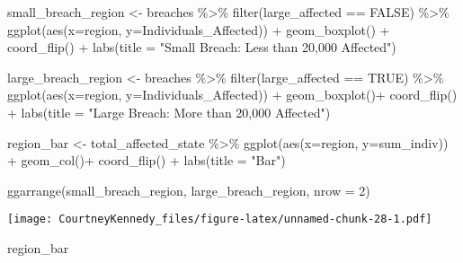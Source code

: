 \documentclass[
]{article}
\newenvironment{Shaded}{\begin{snugshade}}{\end{snugshade}}
\newcommand{\AttributeTok}[1]{\textcolor[rgb]{0.77,0.63,0.00}{#1}}
\newcommand{\ConstantTok}[1]{\textcolor[rgb]{0.00,0.00,0.00}{#1}}
\newcommand{\DecValTok}[1]{\textcolor[rgb]{0.00,0.00,0.81}{#1}}
\newcommand{\FunctionTok}[1]{\textcolor[rgb]{0.00,0.00,0.00}{#1}}
\newcommand{\NormalTok}[1]{#1}
\newcommand{\OtherTok}[1]{\textcolor[rgb]{0.56,0.35,0.01}{#1}}
\newcommand{\SpecialCharTok}[1]{\textcolor[rgb]{0.00,0.00,0.00}{#1}}
\newcommand{\StringTok}[1]{\textcolor[rgb]{0.31,0.60,0.02}{#1}}
\begin{document}
\begin{Shaded}
\begin{Highlighting}[]
\NormalTok{small\_breach\_region }\OtherTok{\textless{}{-}}\NormalTok{ breaches }\SpecialCharTok{\%\textgreater{}\%}
  \FunctionTok{filter}\NormalTok{(large\_affected }\SpecialCharTok{==} \ConstantTok{FALSE}\NormalTok{) }\SpecialCharTok{\%\textgreater{}\%}
  \FunctionTok{ggplot}\NormalTok{(}\FunctionTok{aes}\NormalTok{(}\AttributeTok{x=}\NormalTok{region, }\AttributeTok{y=}\NormalTok{Individuals\_Affected)) }\SpecialCharTok{+}
  \FunctionTok{geom\_boxplot}\NormalTok{() }\SpecialCharTok{+}
  \FunctionTok{coord\_flip}\NormalTok{() }\SpecialCharTok{+}
  \FunctionTok{labs}\NormalTok{(}\AttributeTok{title =} \StringTok{"Small Breach: Less than 20,000 Affected"}\NormalTok{)}

\NormalTok{large\_breach\_region }\OtherTok{\textless{}{-}}\NormalTok{ breaches }\SpecialCharTok{\%\textgreater{}\%}
  \FunctionTok{filter}\NormalTok{(large\_affected }\SpecialCharTok{==} \ConstantTok{TRUE}\NormalTok{) }\SpecialCharTok{\%\textgreater{}\%}
  \FunctionTok{ggplot}\NormalTok{(}\FunctionTok{aes}\NormalTok{(}\AttributeTok{x=}\NormalTok{region, }\AttributeTok{y=}\NormalTok{Individuals\_Affected)) }\SpecialCharTok{+}
  \FunctionTok{geom\_boxplot}\NormalTok{()}\SpecialCharTok{+}
  \FunctionTok{coord\_flip}\NormalTok{() }\SpecialCharTok{+}
  \FunctionTok{labs}\NormalTok{(}\AttributeTok{title =} \StringTok{"Large Breach: More than 20,000 Affected"}\NormalTok{)}


\NormalTok{region\_bar }\OtherTok{\textless{}{-}}\NormalTok{ total\_affected\_state }\SpecialCharTok{\%\textgreater{}\%}
  \FunctionTok{ggplot}\NormalTok{(}\FunctionTok{aes}\NormalTok{(}\AttributeTok{x=}\NormalTok{region, }\AttributeTok{y=}\NormalTok{sum\_indiv)) }\SpecialCharTok{+}
  \FunctionTok{geom\_col}\NormalTok{()}\SpecialCharTok{+}
  \FunctionTok{coord\_flip}\NormalTok{() }\SpecialCharTok{+}
  \FunctionTok{labs}\NormalTok{(}\AttributeTok{title =} \StringTok{"Bar"}\NormalTok{)}

\FunctionTok{ggarrange}\NormalTok{(small\_breach\_region, large\_breach\_region, }\AttributeTok{nrow =} \DecValTok{2}\NormalTok{)}
\end{Highlighting}
\end{Shaded}

\texttt{[image: CourtneyKennedy\_files/figure-latex/unnamed-chunk-28-1.pdf]}

\begin{Shaded}
\begin{Highlighting}[]
\NormalTok{region\_bar}
\end{Highlighting}
\end{Shaded}
\end{document}
